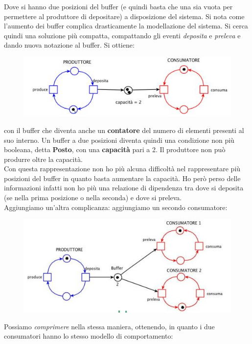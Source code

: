 \documentclass[a4paper,12pt, oneside]{book}
\begin{document}
\begin{esempio}
  Dove si hanno due posizioni del buffer (e quindi basta che una sia vuota per
  permettere al produttore di depositare) a disposizione del sistema. Si nota
  come l'aumento dei buffer complica drasticamente la modellazione del sistema.
  Si cerca quindi una soluzione più compatta, compattando gli eventi
  \textit{deposita} e \textit{preleva} e dando nuova notazione al buffer. Si
  ottiene:
  \begin{figure}[H]
    \centering
    \includegraphics[scale = 0.6]{img/pt4.jpg} 
  \end{figure}
  con il buffer che diventa anche un \textbf{contatore} del numero di elementi
  presenti al suo interno. Un buffer a due posizioni diventa quindi una
  condizione non più booleana, detta \textbf{Posto}, con una \textbf{capacità}
  pari a 2. Il produttore non può produrre oltre la capacità.\\
  Con questa rappresentazione non ho più alcuna difficoltà nel rappresentare più
  posizioni del buffer in quanto basta aumentare la capacità. Ho però perso
  delle informazioni infatti non ho più una relazione di dipendenza tra dove si
  deposita (se nella prima posizione o nella seconda) e dove si preleva.\\
  Aggiungiamo un'altra complicanza: aggiungiamo un secondo consumatore:
  \begin{figure}[H]
    \centering
    \includegraphics[scale = 0.6]{img/pt5.jpg} 
  \end{figure}
  Possiamo \textit{comprimere} nella stessa maniera, ottenendo, in quanto i due
  consumatori hanno lo stesso modello di comportamento:

\end{esempio}
\end{document}
